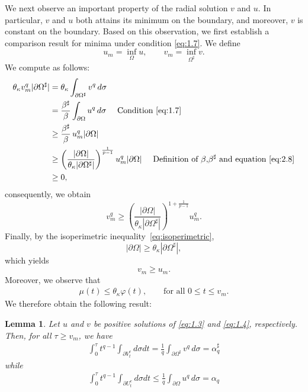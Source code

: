 \documentclass[11pt]{article}
\newtheorem{lemma}[theorem]{Lemma}
\numberwithin{equation}{section}
\theoremstyle{definition}
\theoremstyle{remark}
\begin{document}
We next observe an important property of the radial solution $v$ and $u$. In particular, 
$v$ and $u$ both attains its minimum on the boundary, and moreover, $v$
 is constant on the boundary. Based on this observation, 
we first establish a comparison result for minima under condition \eqref{eq:1.7}.
\noindent
We define
\[
u_m = \inf_{\Omega} u,
\qquad
v_m = \inf_{\Omega^\sharp} v.
\]
\noindent
We compute as follows:
\begin{align*}
\theta_\kappa v_m^{q} |\partial\Omega^\sharp|
&=
\theta_\kappa \int_{\partial\Omega^\sharp} v^{q}\,d\sigma
\\
&=
\frac{\beta^\sharp}{\beta}
\int_{\partial\Omega} u^{q}\,d\sigma\quad \text{ Condition \eqref{eq:1.7}}
\\
&\ge
\frac{\beta^\sharp}{\beta}\, u_m^{q} |\partial\Omega|
\\
&\ge
\left(\frac{|\partial\Omega|}{\theta_\kappa |\partial\Omega^\sharp|}\right)^{\frac{1}{p-1}} 
u_m^{q} |\partial\Omega|\quad \text{ Definition of } \beta \text{,} \beta^\sharp \text{ and equation}~\eqref{eq:2.8}
\\
&\ge 0,
\end{align*}
\noindent
consequently, we obtain
\[
v_m^{q}
\ge
\left(\frac{|\partial\Omega|}{\theta_\kappa |\partial\Omega^\sharp|}\right)^{1+\frac{1}{p-1}}
u_m^{q}.
\]
\noindent
Finally, by the isoperimetric inequality~\eqref{eq:isoperimetric},
\[
|\partial\Omega|
\ge
\theta_\kappa |\partial\Omega^\sharp|,
\]
which yields
\[
v_m \ge u_m.
\]
Moreover, we observe that
\begin{align}\label{eq:3.3}
\mu(t) \le \theta_\kappa \varphi(t),
\qquad
\text{for all } 0\le t \le v_m.
\end{align}
We therefore obtain the following result:
\begin{lemma}
Let $u$ and $v$ be positive solutions of \eqref{eq:1.3} and \eqref{eq:1.4}, respectively. Then, for all $\tau\ge v_m$, we have
\begin{align*}
\int_0^{\tau}t^{q-1}\int_{\partial V_t^e} d\sigma dt
=
\frac{1}{q}\int_{\partial\Omega^\sharp} v^q\, d\sigma
= \alpha_q^\sharp
\end{align*}
while
\begin{align*}
\int_0^{\tau}t^{q-1}\int_{\partial U_t^e} d\sigma dt
\le
\frac{1}{q}\int_{\partial\Omega} u^q\, d\sigma
=\alpha_q
\end{align*}
\end{lemma}
\end{document}
